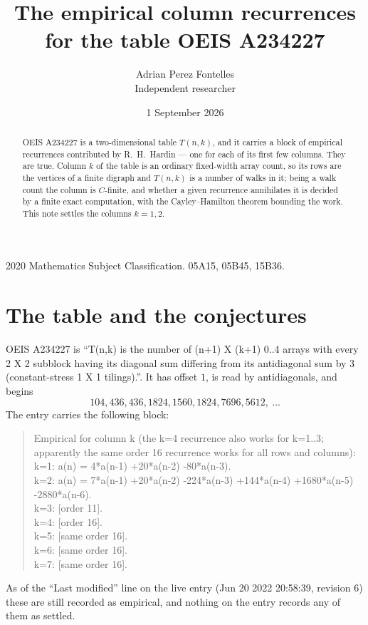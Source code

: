 \documentclass[11pt,a4paper]{article}
\title{The empirical column recurrences for the table OEIS A234227}
\author{Adrian Perez Fontelles\\ \small Independent researcher}
\date{1 September 2026}
\theoremstyle{plain}
\theoremstyle{definition}
\begin{document}
\maketitle

\begin{abstract}
OEIS A234227 is a two-dimensional table $T(n,k)$, and it carries a block of empirical
recurrences contributed by R.~H.~Hardin --- one for each of its first few columns. They are
true. Column $k$ of the table is an ordinary fixed-width array count, so its rows are the
vertices of a finite digraph and $T(n,k)$ is a number of walks in it; being a walk count the
column is $C$-finite, and whether a given recurrence annihilates it is decided by a finite
exact computation, with the Cayley--Hamilton theorem bounding the work. This note settles the
columns $k=1, 2$.
\end{abstract}

\noindent\small 2020 Mathematics Subject Classification. 05A15, 05B45, 15B36.\normalsize

\section{The table and the conjectures}

OEIS A234227 is ``T(n,k) is the number of (n+1) X (k+1) 0..4 arrays with every 2 X 2 subblock having its diagonal sum differing from its antidiagonal sum by 3 (constant-stress 1 X 1 tilings).''. It has offset $1$, is
read by antidiagonals, and begins
\[
104, 436, 436, 1824, 1560, 1824, 7696, 5612,\ \dots
\]
The entry carries the following block:
\begin{quote}\small
Empirical for column k (the k=4 recurrence also works for k=1..3; apparently the same order 16 recurrence works for all rows and columns):\\
k=1: a(n) = 4*a(n-1) +20*a(n-2) -80*a(n-3).\\
k=2: a(n) = 7*a(n-1) +20*a(n-2) -224*a(n-3) +144*a(n-4) +1680*a(n-5) -2880*a(n-6).\\
k=3: [order 11].\\
k=4: [order 16].\\
k=5: [same order 16].\\
k=6: [same order 16].\\
k=7: [same order 16].\\
\end{quote}
As of the ``Last modified'' line on the live entry (Jun 20 2022 20:58:39, revision 6) these are still
recorded as empirical, and nothing on the entry records any of them as settled.
\end{document}
